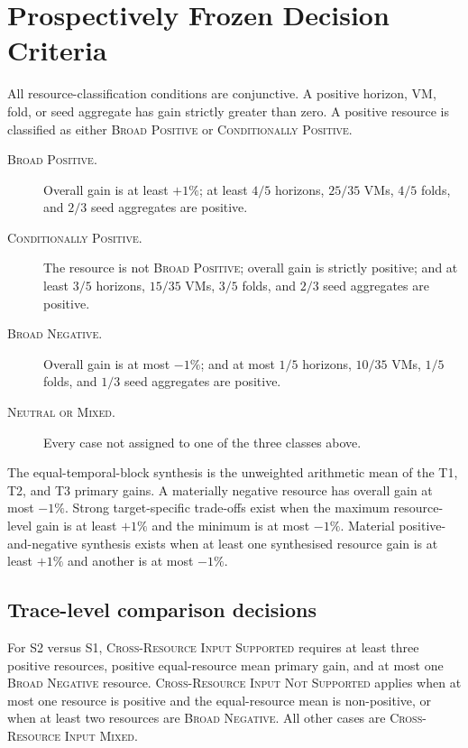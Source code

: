 \documentclass[a4paper,11pt]{article}
\begin{document}
\section*{Prospectively Frozen Decision Criteria}

All resource-classification conditions are conjunctive.  A positive horizon,
VM, fold, or seed aggregate has gain strictly greater than zero.  A positive
resource is classified as either \textsc{Broad Positive} or
\textsc{Conditionally Positive}.

\begin{description}
  \item[\textsc{Broad Positive}.] Overall gain is at least $+1\%$; at least
    $4/5$ horizons, $25/35$ VMs, $4/5$ folds, and $2/3$ seed aggregates are
    positive.
  \item[\textsc{Conditionally Positive}.] The resource is not \textsc{Broad
    Positive}; overall gain is strictly positive; and at least $3/5$ horizons,
    $15/35$ VMs, $3/5$ folds, and $2/3$ seed aggregates are positive.
  \item[\textsc{Broad Negative}.] Overall gain is at most $-1\%$; and at most
    $1/5$ horizons, $10/35$ VMs, $1/5$ folds, and $1/3$ seed aggregates are
    positive.
  \item[\textsc{Neutral or Mixed}.] Every case not assigned to one of the three
    classes above.
\end{description}

The equal-temporal-block synthesis is the unweighted arithmetic mean of the T1,
T2, and T3 primary gains.  A materially negative resource has overall gain at
most $-1\%$.  Strong target-specific trade-offs exist when the maximum
resource-level gain is at least $+1\%$ and the minimum is at most $-1\%$.
Material positive-and-negative synthesis exists when at least one synthesised
resource gain is at least $+1\%$ and another is at most $-1\%$.

\subsection*{Trace-level comparison decisions}

For S2 versus S1, \textsc{Cross-Resource Input Supported} requires at least
three positive resources, positive equal-resource mean primary gain, and at
most one \textsc{Broad Negative} resource.  \textsc{Cross-Resource Input Not
Supported} applies when at most one resource is positive and the equal-resource
mean is non-positive, or when at least two resources are \textsc{Broad
Negative}.  All other cases are \textsc{Cross-Resource Input Mixed}.
\end{document}
